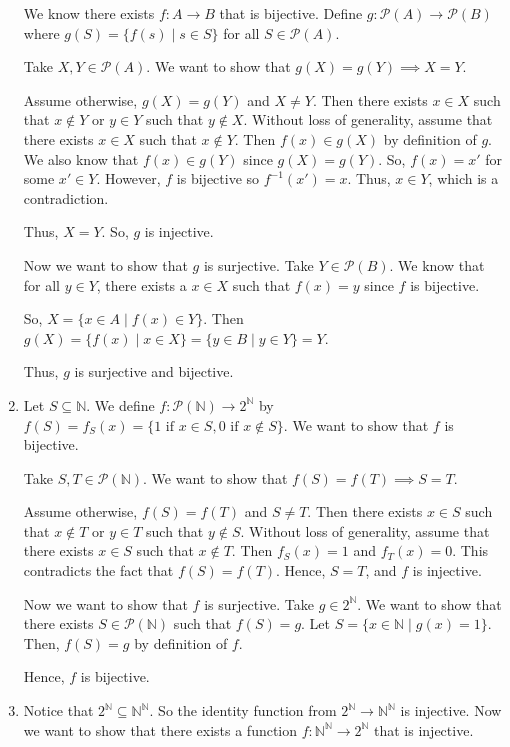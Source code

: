 \documentclass[12pt]{article}
\begin{document}
\begin{enumerate}[start=1,label={\bfseries Exercise \arabic*:},leftmargin=1in]
    We know there exists $f: A \rightarrow B$ that is bijective. 
    Define $g: \mathcal{P}(A) \rightarrow \mathcal{P}(B)$ where $g(S) = \{f(s) \mid s \in S\}$ for all $S \in \mathcal{P}(A)$.

    Take $X, Y \in \mathcal{P}(A)$. We want to show that $g(X) = g(Y) \implies X = Y$.

    Assume otherwise, $g(X) = g(Y)$ and $X \neq Y$. Then there exists $x \in X$ such that $x \notin Y$ or $y \in Y$ such that $y \notin X$. 
    Without loss of generality, assume that there exists $x \in X$ such that $x \notin Y$. 
    Then $f(x) \in g(X)$ by definition of $g$. We also know that $f(x) \in g(Y)$ since $g(X) = g(Y)$. 
    So, $f(x) = x'$ for some $x' \in Y$. However, $f$ is bijective so $f^{-1}(x') = x$. Thus, $x \in Y$, which is a contradiction. 

    Thus, $X = Y$. So, $g$ is injective.

    Now we want to show that $g$ is surjective. Take $Y \in \mathcal{P}(B)$.  
    We know that for all $y \in Y$, there exists a $x \in X$ such that $f(x) = y$ since $f$ is bijective.

    So, $X = \{x \in A \mid f(x) \in Y\}$. 
    Then $g(X) = \{f(x) \mid x \in X\} = \{y \in B \mid y \in Y\} = Y$.

    Thus, $g$ is surjective and bijective. 
    \item Let $S \subseteq \mathbb{N}$. We define $f: \mathcal{P}(\mathbb{N}) \rightarrow 2^{\mathbb{N}}$ by $f(S) = f_{S}(x) = \{ 1 \text{ if } x \in S, 0 \text{ if } x \notin S\}$.
    We want to show that $f$ is bijective. 

    Take $S, T \in \mathcal{P}(\mathbb{N})$. We want to show that $f(S) = f(T) \implies S = T$.

    Assume otherwise, $f(S) = f(T)$ and $S \neq T$. Then there exists $x \in S$ such that $x \notin T$ or $y \in T$ such that $y \notin S$.
    Without loss of generality, assume that there exists $x \in S$ such that $x \notin T$. 
    Then $f_{S}(x) = 1$ and $f_{T}(x) = 0$. This contradicts the fact that $f(S) = f(T)$. Hence, $S = T$, and $f$ is injective.

    Now we want to show that $f$ is surjective. Take $g \in 2^{\mathbb{N}}$. We want to show that there exists $S \in \mathcal{P}(\mathbb{N})$ such that $f(S) = g$.
    Let $S = \{x \in \mathbb{N} \mid g(x) = 1\}$. Then, $f(S) = g$ by definition of $f$. 

    Hence, $f$ is bijective. 

    \item Notice that $2^{\mathbb{N}} \subseteq \mathbb{N}^{\mathbb{N}}$. So the identity function from $2^{\mathbb{N}} \rightarrow \mathbb{N}^{\mathbb{N}}$ is injective. 
    Now we want to show that there exists a function $f:\mathbb{N}^\mathbb{N} \rightarrow 2^{\mathbb{N}}$ that is injective. 


\end{enumerate}
\end{document}
